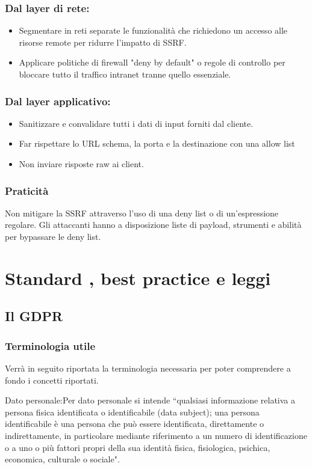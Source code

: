 \subsubsection{Dal layer di rete:}
\begin{itemize}
    \item Segmentare in reti separate le funzionalità che richiedono un accesso alle risorse remote per ridurre l'impatto di SSRF.
    \item Applicare politiche di firewall "deny by default" o regole di controllo per bloccare tutto il traffico intranet tranne quello essenziale.
\end{itemize}
\subsubsection{Dal layer applicativo:}
\begin{itemize}
    \item Sanitizzare e convalidare tutti i dati di input forniti dal cliente.
    \item Far rispettare lo URL schema, la porta e la destinazione con una allow list
    \item Non inviare risposte raw ai client.
\end{itemize}
\subsubsection{Praticità}
Non mitigare la SSRF attraverso l'uso di una deny list o di un'espressione regolare. Gli attaccanti hanno a disposizione liste di payload, strumenti e abilità per bypassare le deny list.
\section{Standard , best practice e leggi }
\subsection{Il GDPR}
\subsubsection{Terminologia utile}
Verrà in seguito riportata la terminologia necessaria per poter comprendere a fondo i concetti riportati.

Dato personale:Per dato personale si intende “qualsiasi informazione relativa a persona fisica identificata o identificabile (data subject); una persona identificabile è una persona che può essere identificata, direttamente o indirettamente, in particolare mediante riferimento a un numero di identificazione o a uno o più fattori propri della sua identità fisica, fisiologica, psichica, economica, culturale o sociale".

